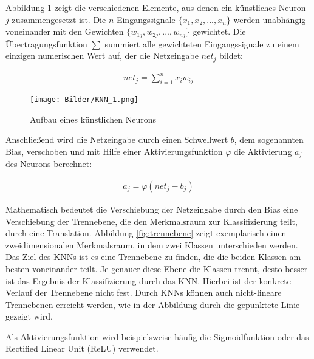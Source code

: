 Abbildung \ref{fig:neuron} zeigt die verschiedenen Elemente, aus denen ein künstliches Neuron $ j $  zusammengesetzt ist. Die $ n $ Eingangssignale $ \{ x_1 , x_2 , ..., x_n \} $ werden unabhängig voneinander mit den Gewichten $ \{ w_{1j}, w_{2j}, ..., w_{nj} \} $ gewichtet. Die Übertragungsfunktion $ \sum $ summiert alle gewichteten Eingangssignale zu einem einzigen numerischen Wert auf, der die Netzeingabe $ net_j $ bildet:

\begin{align}
	net_j = \sum_{i=1}^{n} x_i w_{ij}
\end{align}

\begin{figure}
    \centering
    \texttt{[image: Bilder/KNN\_1.png]}
    \caption{Aufbau eines künstlichen Neurons}
    \label{fig:neuron}
\end{figure}

Anschließend wird die Netzeingabe durch einen Schwellwert $ b $, dem sogenannten Bias, verschoben und mit Hilfe einer Aktivierungsfunktion $ \varphi $ die Aktivierung $ a_j $ des Neurons berechnet:

\begin{align}
	a_j = \varphi ( net_j - b_j )
\end{align}

Mathematisch bedeutet die Verschiebung der Netzeingabe durch den Bias eine Verschiebung der Trennebene, die den Merkmalsraum zur Klassifizierung teilt, durch eine Translation. Abbildung  \ref{fig:trennebene} zeigt exemplarisch einen zweidimensionalen Merkmalsraum, in dem zwei Klassen unterschieden werden. Das Ziel des KNNs ist es eine Trennebene zu finden, die die beiden Klassen am besten voneinander teilt. Je genauer diese Ebene die Klassen trennt, desto besser ist das Ergebnis der Klassifizierung durch das KNN. Hierbei ist der konkrete Verlauf der Trennebene nicht fest. Durch KNNs können auch nicht-lineare Trennebenen erreicht werden, wie in der Abbildung durch die gepunktete Linie gezeigt wird. 

Als Aktivierungsfunktion wird beispielsweise häufig die Sigmoidfunktion oder das Rectified Linear Unit (ReLU) verwendet.

